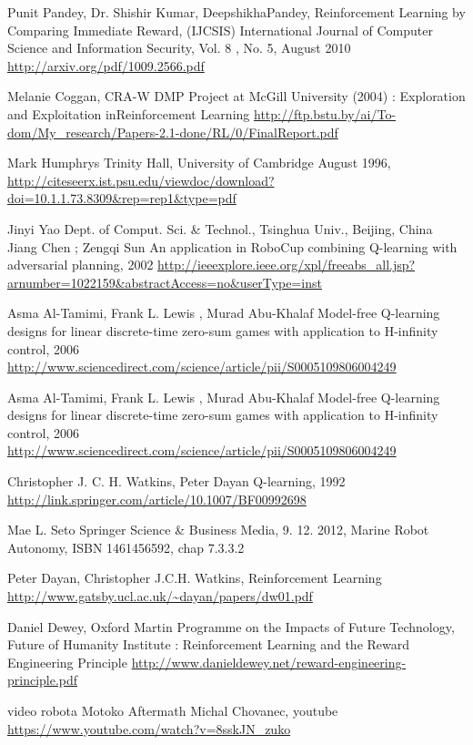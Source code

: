 \begin{thebibliography}{99}
 Punit Pandey, Dr. Shishir Kumar, DeepshikhaPandey,
Reinforcement Learning by Comparing Immediate Reward, (IJCSIS)
International Journal of Computer Science and Information Security, Vol. 8
, No. 5, August 2010
\url{http://arxiv.org/pdf/1009.2566.pdf}

 Melanie Coggan, CRA-W DMP Project at McGill University (2004) :
Exploration and Exploitation inReinforcement Learning
\url{http://ftp.bstu.by/ai/To-dom/My_research/Papers-2.1-done/RL/0/FinalReport.pdf}

 Mark Humphrys Trinity Hall, University of Cambridge August 1996,
\url{http://citeseerx.ist.psu.edu/viewdoc/download?doi=10.1.1.73.8309&rep=rep1&type=pdf}

Jinyi Yao Dept. of Comput. Sci. \& Technol., Tsinghua Univ., Beijing, China Jiang Chen ; Zengqi Sun
An application in RoboCup combining Q-learning with adversarial planning, 2002
\url{http://ieeexplore.ieee.org/xpl/freeabs_all.jsp?arnumber=1022159&abstractAccess=no&userType=inst}


 Asma Al-Tamimi, Frank L. Lewis , Murad Abu-Khalaf
Model-free Q-learning designs for linear discrete-time zero-sum games with application to H-infinity control, 2006
\url{http://www.sciencedirect.com/science/article/pii/S0005109806004249}

 Asma Al-Tamimi, Frank L. Lewis , Murad Abu-Khalaf
Model-free Q-learning designs for linear discrete-time zero-sum games with application to H-infinity control, 2006
\url{http://www.sciencedirect.com/science/article/pii/S0005109806004249}

Christopher J. C. H. Watkins, Peter Dayan
Q-learning, 1992
\url{http://link.springer.com/article/10.1007/BF00992698}

Mae L. Seto Springer Science \& Business Media, 9. 12. 2012,
Marine Robot Autonomy, ISBN	1461456592, chap 7.3.3.2

Peter Dayan, Christopher J.C.H. Watkins,
Reinforcement Learning
\url{http://www.gatsby.ucl.ac.uk/~dayan/papers/dw01.pdf}


Daniel Dewey, Oxford Martin Programme on the Impacts of Future Technology,
Future of Humanity Institute :
Reinforcement Learning and the Reward Engineering Principle
\url{http://www.danieldewey.net/reward-engineering-principle.pdf}

 video robota Motoko Aftermath
Michal Chovanec, youtube
\url{https://www.youtube.com/watch?v=8sskJN_zuko}

\end{thebibliography}
